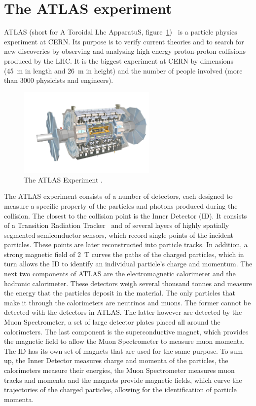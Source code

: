 \section{The ATLAS experiment}
ATLAS (short for A Toroidal Lhc ApparatuS, figure~\ref{fig:atlas})~\cite{Jenni:1193085} is a particle physics experiment at CERN. Its purpose is to verify current theories and to search for new discoveries by observing and analysing high energy proton-proton collisions produced by the LHC. It is the biggest experiment at CERN by dimensions (45~m in length and 26~m in height) and the number of people involved (more than 3000 physicists and engineers).
\begin{figure}[!t]
\centering
\includegraphics[width=0.6\textwidth]{01_introduction/pics/atlas3}
\caption{The ATLAS Experiment \cite{Pequenao:1095924}.}
\label{fig:atlas}
\end{figure}
The ATLAS experiment consists of a number of detectors, each designed to measure a specific property of the particles and photons produced during the collision. The closest to the collision point is the Inner Detector (ID). It consists of a Transition Radiation Tracker~\cite{Danielsson:2194938} and of several layers of highly spatially segmented semiconductor sensors, which record single points of the incident particles. These points are later reconstructed into particle tracks. In addition, a strong magnetic field of 2~T curves the paths of the charged particles, which in turn allows the ID to identify an individual particle's charge and momentum. The next two components of ATLAS are the electromagnetic calorimeter and the hadronic calorimeter. These detectors weigh several thousand tonnes and measure the energy that the particles deposit in the material. The only particles that make it through the calorimeters are neutrinos and muons. The former cannot be detected with the detectors in ATLAS. The latter however are detected by the Muon Spectrometer, a set of large detector plates placed all around the calorimeters. The last component is the superconductive magnet, which provides the magnetic field to allow the Muon Spectrometer to measure muon momenta. The ID has its own set of magnets that are used for the same purpose. To sum up, the Inner Detector measures charge and momenta of the particles, the calorimeters measure their energies, the Muon Spectrometer measures muon tracks and momenta and the magnets provide magnetic fields, which curve the trajectories of the charged particles, allowing for the identification of particle momenta.

